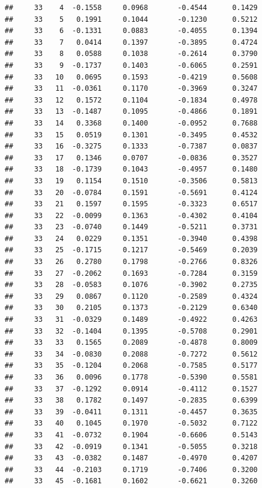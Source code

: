\documentclass[
]{article}
\begin{document}
\begin{verbatim}
##     33    4  -0.1558     0.0968       -0.4544      0.1429 
##     33    5   0.1991     0.1044       -0.1230      0.5212 
##     33    6  -0.1331     0.0883       -0.4055      0.1394 
##     33    7   0.0414     0.1397       -0.3895      0.4724 
##     33    8   0.0588     0.1038       -0.2614      0.3790 
##     33    9  -0.1737     0.1403       -0.6065      0.2591 
##     33   10   0.0695     0.1593       -0.4219      0.5608 
##     33   11  -0.0361     0.1170       -0.3969      0.3247 
##     33   12   0.1572     0.1104       -0.1834      0.4978 
##     33   13  -0.1487     0.1095       -0.4866      0.1891 
##     33   14   0.3368     0.1400       -0.0952      0.7688 
##     33   15   0.0519     0.1301       -0.3495      0.4532 
##     33   16  -0.3275     0.1333       -0.7387      0.0837 
##     33   17   0.1346     0.0707       -0.0836      0.3527 
##     33   18  -0.1739     0.1043       -0.4957      0.1480 
##     33   19   0.1154     0.1510       -0.3506      0.5813 
##     33   20  -0.0784     0.1591       -0.5691      0.4124 
##     33   21   0.1597     0.1595       -0.3323      0.6517 
##     33   22  -0.0099     0.1363       -0.4302      0.4104 
##     33   23  -0.0740     0.1449       -0.5211      0.3731 
##     33   24   0.0229     0.1351       -0.3940      0.4398 
##     33   25  -0.1715     0.1217       -0.5469      0.2039 
##     33   26   0.2780     0.1798       -0.2766      0.8326 
##     33   27  -0.2062     0.1693       -0.7284      0.3159 
##     33   28  -0.0583     0.1076       -0.3902      0.2735 
##     33   29   0.0867     0.1120       -0.2589      0.4324 
##     33   30   0.2105     0.1373       -0.2129      0.6340 
##     33   31  -0.0329     0.1489       -0.4922      0.4263 
##     33   32  -0.1404     0.1395       -0.5708      0.2901 
##     33   33   0.1565     0.2089       -0.4878      0.8009 
##     33   34  -0.0830     0.2088       -0.7272      0.5612 
##     33   35  -0.1204     0.2068       -0.7585      0.5177 
##     33   36   0.0096     0.1778       -0.5390      0.5581 
##     33   37  -0.1292     0.0914       -0.4112      0.1527 
##     33   38   0.1782     0.1497       -0.2835      0.6399 
##     33   39  -0.0411     0.1311       -0.4457      0.3635 
##     33   40   0.1045     0.1970       -0.5032      0.7122 
##     33   41  -0.0732     0.1904       -0.6606      0.5143 
##     33   42  -0.0919     0.1341       -0.5055      0.3218 
##     33   43  -0.0382     0.1487       -0.4970      0.4207 
##     33   44  -0.2103     0.1719       -0.7406      0.3200 
##     33   45  -0.1681     0.1602       -0.6621      0.3260 

\end{verbatim}
\end{document}
